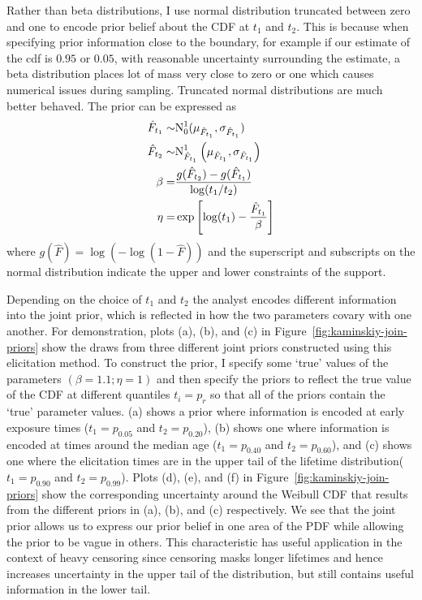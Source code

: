 Rather than beta distributions, I use normal distribution truncated between zero and one to encode prior belief about the CDF at $t_1$ and $t_2$. This is because when specifying prior information close to the boundary, for example if our estimate of the cdf is $0.95$ or $0.05$, with reasonable uncertainty surrounding the estimate, a beta distribution places lot of mass very close to zero or one which causes numerical issues during sampling. Truncated normal distributions are much better behaved. The prior can be expressed as
\begin{align*}
    \hat{F}_{t_1} \sim & \hbox{N}^{1}_{0}(\mu_{\hat{F}_{t_1}}, \sigma_{\hat{F}_{t_1}})             \\
    \hat{F}_{t_2} \sim & \hbox{N}^{1}_{\hat{F}_{t_1}}\left(\mu_{\hat{F}_{t_1}}, \sigma_{\hat{F}_{t_1}}\right) \\
    \beta            = & \frac{g(\hat{F}_{t_2}) - g(\hat{F}_{t_1})}{\log(t_1 / t_2)}               \\
    \eta             = & \exp\left[\log(t_1) - \frac{\hat{F}_{t_1}}{\beta}\right]
\end{align*}
where $g(\hat{F}) = \log(-\log(1 - \hat{F}))$ and the superscript and subscripts on the normal distribution indicate the upper and lower constraints of the support.

Depending on the choice of $t_1$ and $t_2$ the analyst encodes different information into the joint prior, which is reflected in how the two parameters covary with one another. For demonstration, plots (a), (b), and (c) in Figure~\ref{fig:kaminskiy-join-priors} show the draws from three different joint priors constructed using this elicitation method. To construct the prior, I specify some `true' values of the parameters $(\beta = 1.1; \eta = 1)$ and then specify the priors to reflect the true value of the CDF at different quantiles $t_i = p_r$ so that all of the priors contain the `true' parameter values. (a) shows a prior where information is encoded at early exposure times ($t_1 = p_{0.05}$ and $t_2 = p_{0.20}$), (b) shows one where information is encoded at times around the median age ($t_1 = p_{0.40}$ and $t_2 = p_{0.60}$), and (c) shows one where the elicitation times are in the upper tail of the lifetime distribution($t_1 = p_{0.90}$ and $t_2 = p_{0.99}$). Plots (d), (e), and (f) in Figure~\ref{fig:kaminskiy-join-priors} show the corresponding uncertainty around the Weibull CDF that results from the different priors in (a), (b), and (c) respectively. We see that the joint prior allows us to express our prior belief in one area of the PDF while allowing the prior to be vague in others. This characteristic has useful application in the context of heavy censoring since censoring masks longer lifetimes and hence increases uncertainty in the upper tail of the distribution, but still contains useful information in the lower tail.

